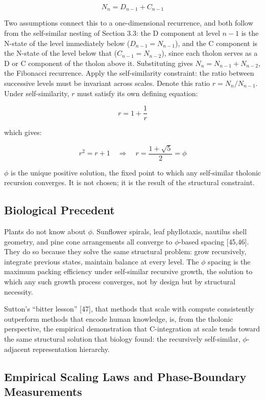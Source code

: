 \documentclass[12pt]{article}
\begin{document}
\[N_n = D_{n-1} + C_{n-1}\]

Two assumptions connect this to a one-dimensional recurrence, and both
follow from the self-similar nesting of Section 3.3: the D component at
level \(n-1\) is the N-state of the level immediately below
(\(D_{n-1} = N_{n-1}\)), and the C component is the N-state of the level
below that (\(C_{n-1} = N_{n-2}\)), since each tholon serves as a D or C
component of the tholon above it. Substituting gives
\(N_n = N_{n-1} + N_{n-2}\), the Fibonacci recurrence. Apply the
self-similarity constraint: the ratio between successive levels must be
invariant across scales. Denote this ratio \(r = N_n / N_{n-1}\). Under
self-similarity, \(r\) must satisfy its own defining equation:

\[r = 1 + \frac{1}{r}\]

which gives:

\[r^2 = r + 1 \quad \Longrightarrow \quad r = \frac{1 + \sqrt{5}}{2} = \phi\]

\(\phi\) is the unique positive solution, the fixed point to which any
self-similar tholonic recursion converges. It is not chosen; it is the
result of the structural constraint.

\subsection{Biological Precedent}\label{biological-precedent}

Plants do not know about \(\phi\). Sunflower spirals, leaf phyllotaxis,
nautilus shell geometry, and pine cone arrangements all converge to
\(\phi\)-based spacing {[}45,46{]}. They do so because they solve the
same structural problem: grow recursively, integrate previous states,
maintain balance at every level. The \(\phi\) spacing is the maximum
packing efficiency under self-similar recursive growth, the solution to
which any such growth process converges, not by design but by structural
necessity.

Sutton's ``bitter lesson'' {[}47{]}, that methods that scale with
compute consistently outperform methods that encode human knowledge, is,
from the tholonic perspective, the empirical demonstration that
C-integration at scale tends toward the same structural solution that
biology found: the recursively self-similar, \(\phi\)-adjacent
representation hierarchy.

\subsection{Empirical Scaling Laws and Phase-Boundary Measurements}\label{empirical-scaling-laws-and-phase-boundary-measurements}
\end{document}
